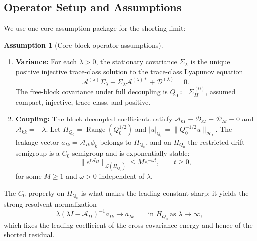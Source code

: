 \documentclass[preprint,12pt]{elsarticle}
\theoremstyle{plain}
\theoremstyle{definition}
\newtheorem{assumption}[theorem]{Assumption}
\theoremstyle{remark}
\begin{document}
    \subsection{Operator Setup and Assumptions}
    \label{sec:setup:assumptions}

    We use one core assumption package for the shorting limit:

    \begin{assumption}[Core block-operator assumptions]
        \label{assum:core_analytical}
        \begin{enumerate}[label=(\roman*)]
            \item[(i)] \textbf{Variance:} \label{assum:linear_second_moment}
            For each $\lambda>0$, the stationary covariance $\Sigma_\lambda$ is
            the unique positive injective trace-class solution to the trace-class
            Lyapunov equation
            \begin{equation}
                \label{eq:op_lyapunov}
                \mathcal{A}^{(\lambda)}\Sigma_\lambda + \Sigma_\lambda\mathcal{A}^{(\lambda)*} + \mathcal{D}^{(\lambda)} = 0.
            \end{equation}
            The free-block covariance under full decoupling is
            $Q_0\coloneqq\Sigma_{II}^{(0)}$, assumed compact, injective, trace-class,
            and positive.

            \item[(ii)] \textbf{Coupling:} \label{assum:cm_stability}
            The block-decoupled coefficients satisfy $\mathcal{A}_{kI}=\mathcal{D}_{kI}=\mathcal{D}_{Ik}=0$ and $\mathcal{A}_{kk}=-\lambda$.
            Let
            $H_{Q_0}=\operatorname{Range}(Q_0^{1/2})$ and
            $|u|_{Q_0}=\|Q_0^{-1/2}u\|_{\mathcal{H}_I}$. The leakage vector
            $a_{Ik}=\mathcal{A}_{Ik}\phi_k$ belongs to $H_{Q_0}$, and
            on $H_{Q_0}$ the restricted drift semigroup is a
            $C_0$-semigroup and is exponentially stable:
            \begin{equation}
                \|e^{t\mathcal{A}_{II}}\|_{\mathcal{L}(H_{Q_0})} \le M e^{-\omega t},\qquad t\ge0,
            \end{equation}
            for some $M\ge1$ and $\omega>0$ independent of $\lambda$.
        \end{enumerate}
    \end{assumption}

    The $C_0$ property on $H_{Q_0}$ is what makes the leading constant sharp: it
    yields the strong-resolvent normalization
    \begin{equation}
        \label{eq:resolvent_strong_limit}
        \lambda(\lambda I-\mathcal{A}_{II})^{-1}a_{Ik}\longrightarrow a_{Ik}
        \qquad\text{in }H_{Q_0}\ \text{as }\lambda\to\infty,
    \end{equation}
    which fixes the leading coefficient of the cross-covariance energy and hence
    of the shorted residual.
\end{document}
